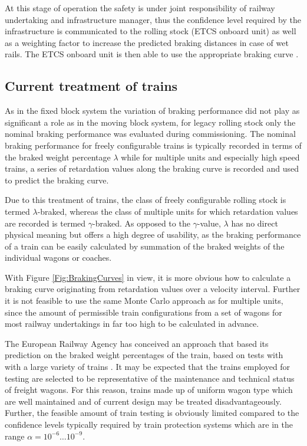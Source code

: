 \documentclass[a4paper, 12pt]{scrartcl}
\begin{document}
At this stage of operation the safety is under joint responsibility of railway undertaking and infrastructure manager, thus the confidence level required by the infrastructure is communicated to the rolling stock (ETCS onboard unit) as well as a weighting factor to increase the predicted braking distances in case of wet rails. The ETCS onboard unit is then able to use the appropriate braking curve \cite{ERAbrakingcurves}.

\subsection{Current treatment of trains}
As in the fixed block system the variation of braking performance did not play as significant a role as in the moving block system, for legacy rolling stock only the nominal braking performance was evaluated during commissioning. The nominal braking performance for freely configurable trains is typically recorded in terms of the braked weight percentage $\lambda$ \cite{uic544-1} while for multiple units and especially high speed trains, a series of retardation values along the braking curve is recorded and used to predict the braking curve.

Due to this treatment of trains, the class of freely configurable rolling stock is termed $\lambda$-braked, whereas the class of multiple units for which retardation values are recorded is termed $\gamma$-braked. As opposed to the $\gamma$-value, $\lambda$ has no direct physical meaning but offers a high degree of usability, as the braking performance of a train can be easily calculated by summation of the braked weights of the individual wagons or coaches.

With Figure \ref{Fig:BrakingCurves} in view, it is more obvious how to calculate a braking curve originating from retardation values over a velocity interval. Further it is not feasible to use the same Monte Carlo approach as for multiple units, since the amount of permissible train configurations from a set of wagons for most railway undertakings in far too high to be calculated in advance.

The European Railway Agency has conceived an approach that based its prediction on the braked weight percentages of the train, based on tests with with a large variety of trains \cite{ERAbrakingcurves}. It may be expected that the trains employed for testing are selected to be representative of the maintenance and technical status of freight wagons. For this reason, trains made up of uniform wagon type which are well maintained and of current design may be treated disadvantageously. Further, the feasible amount of train testing is obviously limited compared to the confidence levels typically required by train protection systems which are in the range $\alpha = 10^{-6} \ldots 10^{-9}$.
\end{document}
